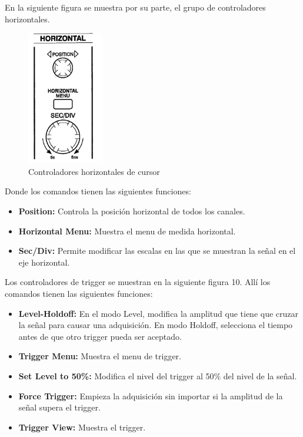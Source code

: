 \documentclass{scrartcl}
\begin{document}
En la siguiente figura se muestra por su parte, el grupo de controladores horizontales.

\begin{figure}[h!]
	\centering
	\includegraphics[width=0.3\textwidth,height=0.25\textheight]{osc-horizontal}
	\caption{Controladores horizontales de cursor}
\end{figure}

Donde los comandos tienen las siguientes funciones:
\begin{itemize}
	\item \textbf{Position:} Controla la posición horizontal de todos los canales.
	\item \textbf{Horizontal Menu:} Muestra el menu de medida horizontal.
	\item \textbf{Sec/Div:} Permite modificar las escalas en las que se muestran la señal en el eje horizontal.
\end{itemize}

Los controladores de trigger se muestran en la siguiente figura 10. Allí los comandos tienen las siguientes funciones:

\begin{itemize}
	\item \textbf{Level-Holdoff:} En el modo Level, modifica la amplitud que tiene que cruzar la señal para causar una adquisición. En modo Holdoff, selecciona el tiempo antes de que otro trigger pueda ser aceptado.
	\item \textbf{Trigger Menu:} Muestra el menu de trigger.
	\item \textbf{Set Level to 50\%:} Modifica el nivel del trigger al 50\% del nivel de la señal.
	\item \textbf{Force Trigger:} Empieza la adquisición sin importar si la amplitud de la señal supera el trigger.
	\item \textbf{Trigger View:} Muestra el trigger.
\end{itemize}
\end{document}
